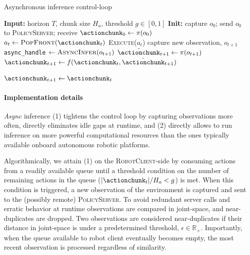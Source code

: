 \begin{algorithm}
  \caption{Asynchronous inference control-loop}
  \label{alg:robotclient}
  \begin{algorithmic}[1]
    \State \textbf{Input:} horizon \( T \), chunk size \( H_a \), threshold \( g\in[0,1] \)
    \State \textbf{Init:} capture \( o_0 \); send \( o_0 \) to \textsc{PolicyServer};
           receive \( \actionchunk_0 \gets \pi(o_0) \)
        \State \( a_t \gets \textsc{PopFront}(\actionchunk_t) \)
        \State \textsc{Execute}(\( a_t \)) 
         
            \State capture new observation, \( o_{t+1} \)
             
                \State \texttt{async\_handle} \( \gets \textsc{AsyncInfer}(o_{t+1})\) 
                \State \( \tilde{\actionchunk}_{t+1} \gets \pi(o_{t+1}) \) 
                \State \( \actionchunk_{t+1} \gets f(\actionchunk_t,\tilde{\actionchunk}_{t+1}) \) 
                
            \EndIf
        \EndIf
            \State \( \actionchunk_{t+1} \gets \actionchunk_t \) 
        \EndIf
    \EndFor
  \end{algorithmic}
  \label{alg:async-inference}
\end{algorithm}


\paragraph{Implementation details}

\emph{Async} inference (1) tightens the control loop by capturing observations more often, directly eliminates idle gaps at runtime, and (2) directly allows to run inference on more powerful computational resources than the ones typically available onboard autonomous robotic platforms.

Algorithmically, we attain (1) on the \textsc{RobotClient}-side by consuming actions from a readily available queue until a threshold condition on the number of remaining actions in the queue (\(\vert \actionchunk_t \vert / H_a < g \)) is met. When this condition is triggered, a new observation of the environment is captured and sent to the (possibly remote) \textsc{PolicyServer}. 
To avoid redundant server calls and erratic behavior at runtime observations are compared in joint-space, and near-duplicates are dropped.
Two observations are considered near-duplicates if their distance in joint-space is under a predetermined threshold, \( \epsilon \in \mathbb R_+\).
Importantly, when the queue available to robot client eventually becomes empty, the most recent observation is processed regardless of similarity.

